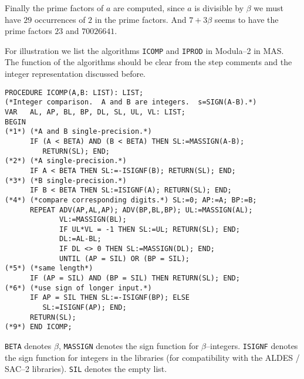 Finally the prime factors of $a$ are computed,
since $a$ is divisible by $\beta$ we must have $29$ 
occurrences of $2$ in the prime factors.
And $7 + 3 \beta$ seems to have the prime factors
$23$ and $70026641$. 

For illustration we list 
the algorithms \verb/ICOMP/ and \verb/IPROD/ in Modula--2
in MAS.
The function of the algorithms should be clear from the 
step comments and the integer representation 
discussed before.

{\footnotesize
\begin{verbatim}
PROCEDURE ICOMP(A,B: LIST): LIST;
(*Integer comparison.  A and B are integers.  s=SIGN(A-B).*)
VAR   AL, AP, BL, BP, DL, SL, UL, VL: LIST;
BEGIN
(*1*) (*A and B single-precision.*)
      IF (A < BETA) AND (B < BETA) THEN SL:=MASSIGN(A-B);
         RETURN(SL); END;
(*2*) (*A single-precision.*)
      IF A < BETA THEN SL:=-ISIGNF(B); RETURN(SL); END;
(*3*) (*B single-precision.*)
      IF B < BETA THEN SL:=ISIGNF(A); RETURN(SL); END;
(*4*) (*compare corresponding digits.*) SL:=0; AP:=A; BP:=B;
      REPEAT ADV(AP,AL,AP); ADV(BP,BL,BP); UL:=MASSIGN(AL); 
             VL:=MASSIGN(BL);
             IF UL*VL = -1 THEN SL:=UL; RETURN(SL); END;
             DL:=AL-BL;
             IF DL <> 0 THEN SL:=MASSIGN(DL); END;
             UNTIL (AP = SIL) OR (BP = SIL);
(*5*) (*same length*)
      IF (AP = SIL) AND (BP = SIL) THEN RETURN(SL); END;
(*6*) (*use sign of longer input.*)
      IF AP = SIL THEN SL:=-ISIGNF(BP); ELSE
         SL:=ISIGNF(AP); END;
      RETURN(SL);
(*9*) END ICOMP;
\end{verbatim}
}
\verb/BETA/ denotes $\beta$,
\verb/MASSIGN/ denotes the sign function for $\beta$--integers.
\verb/ISIGNF/ denotes the sign function for integers in
the libraries (for compatibility with the ALDES / SAC--2 libraries).
\verb/SIL/ denotes the empty list.

